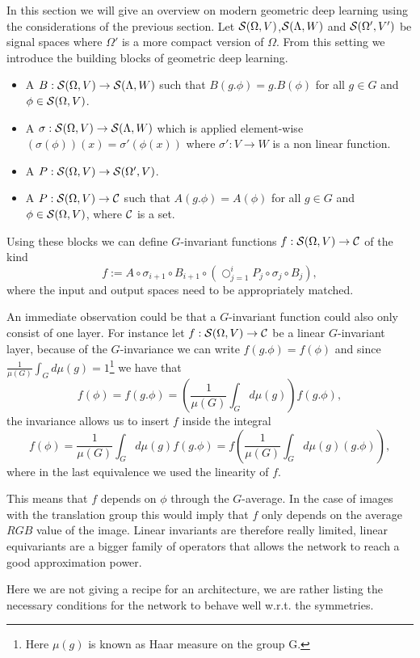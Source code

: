 \documentclass[../3.tex]{subfiles}
\begin{document}
    In this section we will give an overview on modern geometric deep learning using the considerations of the previous section.
    Let $\mathcal{S}(\Omega,V)$,$\mathcal{S}(\Lambda,W)$ and $\mathcal{S}(\Omega',V')$ be signal spaces where {\color{red} $\Omega'$ is a more compact version of $\Omega$}.
    From this setting we introduce the building blocks of geometric deep learning.

    \begin{itemize}
        \item A  $B : \mathcal{S}(\Omega,V) \to \mathcal{S}(\Lambda,W)$ such that
            $B(g.\phi) = g.B(\phi)$ for all $g \in G$ and $\phi \in \mathcal{S}(\Omega,V)$.
        \item A  $\sigma : \mathcal{S}(\Omega,V) \to \mathcal{S}(\Lambda,W)$ which is applied element-wise 
            $(\sigma(\phi))(x) = \sigma'(\phi(x))$ where $\sigma' : V \to W$ is a non linear function.
        \item A  $P : \mathcal{S}(\Omega,V) \to \mathcal{S}(\Omega',V)$.
        \item A  $P : \mathcal{S}(\Omega,V) \to \mathcal{C}$ such that $A(g.\phi) = A(\phi)$ for all $g \in G$ 
        and $\phi \in \mathcal{S}(\Omega,V)$, where $\mathcal{C}$ is a set.
    \end{itemize}

    Using these blocks we can define $G$-invariant functions $f : \mathcal{S}(\Omega,V) \to \mathcal{C}$ of the kind
    \[ f := A \circ \sigma_{i+1} \circ B_{i+1} \circ (\bigcirc_{j = 1}^i P_j \circ \sigma_j \circ B_j ) , \]
    where the input and output spaces need to be appropriately matched.

    An immediate observation could be that a $G$-invariant function could also only consist of one layer.
    For instance let $f : \mathcal{S}(\Omega,V) \to \mathcal{C}$ be a linear $G$-invariant layer, because of the $G$-invariance we can write
    $f(g.\phi) = f(\phi)$ and since $\frac{1}{\mu(G)} \int_G d\mu(g) = 1$\footnote{Here $\mu(g)$ is known as Haar measure on the group G.} we have that
    \[ f(\phi) = f(g.\phi) = (\frac{1}{\mu(G)} \int_G d\mu(g)) f(g.\phi),  \]
    the invariance allows us to insert $f$ inside the integral
    \[ f(\phi) = \frac{1}{\mu(G)} \int_G d\mu(g) f(g.\phi) = f(\frac{1}{\mu(G)} \int_G d\mu(g) (g.\phi)), \]
    where in the last equivalence we used the linearity of $f$.

    This means that $f$ depends on $\phi$ through the $G$-average.
    In the case of images with the translation group this would imply that $f$ only depends on the average $RGB$ value of the image.
    Linear invariants are therefore really limited, linear equivariants are a bigger family of operators that allows the network to reach a good approximation
    power.
    
    Here we are not giving a recipe for an architecture, we are rather listing the necessary conditions for the network to behave well w.r.t. the symmetries.
\end{document}
